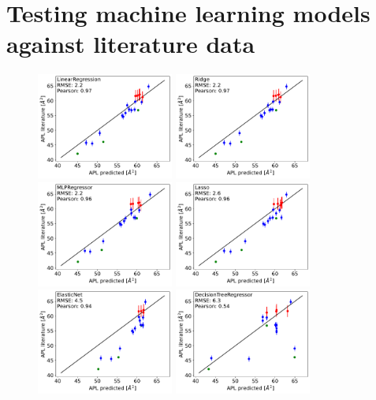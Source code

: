 \documentclass[fleqn,10pt]{wlscirepSI}
\begin{document}
\pagebreak
\section*{Testing machine learning models against literature data}
\begin{figure}[hb]
    \centering
    \includegraphics[width=45mm]{Figures/MLtest/LinearRegressiontest.pdf}
    \includegraphics[width=45mm]{Figures/MLtest/Ridgetest.pdf}
    \includegraphics[width=45mm]{Figures/MLtest/MLPRegressortest.pdf}
    \includegraphics[width=45mm]{Figures/MLtest/Lassotest.pdf}
    \includegraphics[width=45mm]{Figures/MLtest/ElasticNettest.pdf}
    \includegraphics[width=45mm]{Figures/MLtest/DecisionTreeRegressortest.pdf}

\end{figure}
\end{document}
